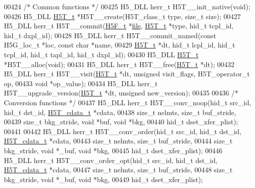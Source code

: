 \begin{DoxyCode}
00424 \textcolor{comment}{/* Common functions */}
00425 H5\_DLL herr\_t H5T\_\_init\_native(\textcolor{keywordtype}{void});
00426 H5\_DLL \hyperlink{struct_h5_t__t}{H5T\_t} *H5T\_\_create(H5T\_class\_t type, \textcolor{keywordtype}{size\_t} size);
00427 H5\_DLL herr\_t H5T\_\_commit(\hyperlink{struct_h5_f__t}{H5F\_t} *\hyperlink{structfile}{file}, \hyperlink{struct_h5_t__t}{H5T\_t} *type, hid\_t tcpl\_id, hid\_t dxpl\_id);
00428 H5\_DLL herr\_t H5T\_\_commit\_named(\textcolor{keyword}{const} H5G\_loc\_t *loc, \textcolor{keyword}{const} \textcolor{keywordtype}{char} *name,
00429     \hyperlink{struct_h5_t__t}{H5T\_t} *dt, hid\_t lcpl\_id, hid\_t tcpl\_id, hid\_t tapl\_id, hid\_t dxpl\_id);
00430 H5\_DLL \hyperlink{struct_h5_t__t}{H5T\_t} *H5T\_\_alloc(\textcolor{keywordtype}{void});
00431 H5\_DLL herr\_t H5T\_\_free(\hyperlink{struct_h5_t__t}{H5T\_t} *dt);
00432 H5\_DLL herr\_t H5T\_\_visit(\hyperlink{struct_h5_t__t}{H5T\_t} *dt, \textcolor{keywordtype}{unsigned} visit\_flags, H5T\_operator\_t op,
00433     \textcolor{keywordtype}{void} *op\_value);
00434 H5\_DLL herr\_t H5T\_\_upgrade\_version(\hyperlink{struct_h5_t__t}{H5T\_t} *dt, \textcolor{keywordtype}{unsigned} new\_version);
00435 
00436 \textcolor{comment}{/* Conversion functions */}
00437 H5\_DLL herr\_t H5T\_\_conv\_noop(hid\_t src\_id, hid\_t dst\_id, \hyperlink{struct_h5_t__cdata__t}{H5T\_cdata\_t} *cdata,
00438                 \textcolor{keywordtype}{size\_t} nelmts, \textcolor{keywordtype}{size\_t} buf\_stride,
00439                             \textcolor{keywordtype}{size\_t} bkg\_stride, \textcolor{keywordtype}{void} *buf, \textcolor{keywordtype}{void} *bkg,
00440                             hid\_t dset\_xfer\_plist);
00441 
00442 H5\_DLL herr\_t H5T\_\_conv\_order(hid\_t src\_id, hid\_t dst\_id, \hyperlink{struct_h5_t__cdata__t}{H5T\_cdata\_t} *cdata,
00443                 \textcolor{keywordtype}{size\_t} nelmts, \textcolor{keywordtype}{size\_t} buf\_stride,
00444                             \textcolor{keywordtype}{size\_t} bkg\_stride, \textcolor{keywordtype}{void} *\_buf, \textcolor{keywordtype}{void} *bkg,
00445                             hid\_t dset\_xfer\_plist);
00446 H5\_DLL herr\_t H5T\_\_conv\_order\_opt(hid\_t src\_id, hid\_t dst\_id, \hyperlink{struct_h5_t__cdata__t}{H5T\_cdata\_t} *cdata,
00447                             \textcolor{keywordtype}{size\_t} nelmts, \textcolor{keywordtype}{size\_t} buf\_stride,
00448                             \textcolor{keywordtype}{size\_t} bkg\_stride, \textcolor{keywordtype}{void} *\_buf, \textcolor{keywordtype}{void} *bkg,
00449                             hid\_t dset\_xfer\_plist);

\end{DoxyCode}
